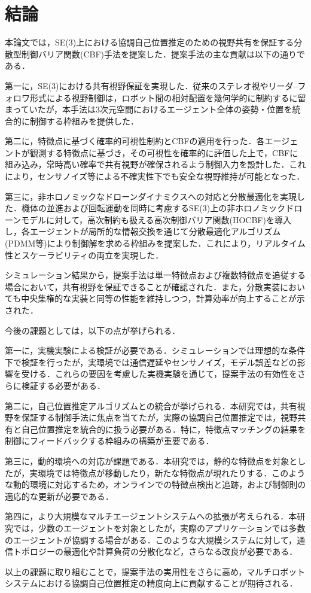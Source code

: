 \section{結論}

本論文では，SE(3)上における協調自己位置推定のための視野共有を保証する分散型制御バリア関数(CBF)手法を提案した．提案手法の主な貢献は以下の通りである．

第一に，SE(3)における共有視野保証を実現した．従来のステレオ視やリーダ–フォロワ形式による視野制御は，ロボット間の相対配置を幾何学的に制約するに留まっていたが，本手法は3次元空間におけるエージェント全体の姿勢・位置を統合的に制御する枠組みを提供した．

第二に，特徴点に基づく確率的可視性制約とCBFの適用を行った．各エージェントが観測する特徴点に基づき，その可視性を確率的に評価した上で，CBFに組み込み，常時高い確率で共有視野が確保されるよう制御入力を設計した．これにより，センサノイズ等による不確実性下でも安全な視野維持が可能となった．

第三に，非ホロノミックなドローンダイナミクスへの対応と分散最適化を実現した．機体の並進および回転運動を同時に考慮するSE(3)上の非ホロノミックドローンモデルに対して，高次制約も扱える高次制御バリア関数(HOCBF)を導入し，各エージェントが局所的な情報交換を通じて分散最適化アルゴリズム(PDMM等)により制御解を求める枠組みを提案した．これにより，リアルタイム性とスケーラビリティの両立を実現した．

シミュレーション結果から，提案手法は単一特徴点および複数特徴点を追従する場合において，共有視野を保証できることが確認された．また，分散実装においても中央集権的な実装と同等の性能を維持しつつ，計算効率が向上することが示された．

今後の課題としては，以下の点が挙げられる．

第一に，実機実験による検証が必要である．シミュレーションでは理想的な条件下で検証を行ったが，実環境では通信遅延やセンサノイズ，モデル誤差などの影響を受ける．これらの要因を考慮した実機実験を通じて，提案手法の有効性をさらに検証する必要がある．

第二に，自己位置推定アルゴリズムとの統合が挙げられる．本研究では，共有視野を保証する制御手法に焦点を当てたが，実際の協調自己位置推定では，視野共有と自己位置推定を統合的に扱う必要がある．特に，特徴点マッチングの結果を制御にフィードバックする枠組みの構築が重要である．

第三に，動的環境への対応が課題である．本研究では，静的な特徴点を対象としたが，実環境では特徴点が移動したり，新たな特徴点が現れたりする．このような動的環境に対応するため，オンラインでの特徴点検出と追跡，および制御則の適応的な更新が必要である．

第四に，より大規模なマルチエージェントシステムへの拡張が考えられる．本研究では，少数のエージェントを対象としたが，実際のアプリケーションでは多数のエージェントが協調する場合がある．このような大規模システムに対して，通信トポロジーの最適化や計算負荷の分散化など，さらなる改良が必要である．

以上の課題に取り組むことで，提案手法の実用性をさらに高め，マルチロボットシステムにおける協調自己位置推定の精度向上に貢献することが期待される．
